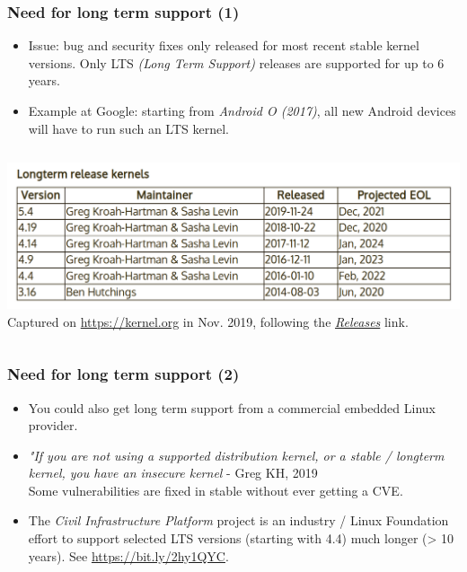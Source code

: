 \begin{frame}[fragile]
  \frametitle{Need for long term support (1)}
  \begin{itemize}
  \item Issue: bug and security fixes only released for most recent
    stable kernel versions. Only LTS {\em (Long Term Support)} releases
    are supported for up to 6 years.
  \item Example at Google: starting from {\em Android O (2017)}, all new Android devices will
    have to run such an LTS kernel.
  \end{itemize}
  \begin{columns}
  \includegraphics[height=0.3\textheight]{slides/sysdev-linux-intro-versioning/longterm-release-kernels.png}\\
  \scriptsize
   Captured on \url{https://kernel.org} in Nov. 2019, following the
   \href{https://www.kernel.org/category/releases.html}{\em Releases} link.
  \end{columns}
\end{frame}

\begin{frame}[fragile]
  \frametitle{Need for long term support (2)}
  \begin{itemize}
  \item You could also get long term support from a commercial embedded
    Linux provider.
  \item {\em "If you are not using a supported distribution kernel, or a stable / longterm
    kernel, you have an insecure kernel} - Greg KH, 2019\\
    Some vulnerabilities are fixed in stable without ever getting a CVE.
  \item The {\em Civil Infrastructure Platform} project is an industry /
    Linux Foundation effort to support selected LTS versions (starting
    with 4.4) much longer (> 10 years). See \url{https://bit.ly/2hy1QYC}.
  \end{itemize}
\end{frame}

